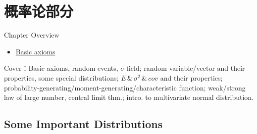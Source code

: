 \section{概率论部分}\label{Section1Probability}
    Chapter Overview
\begin{itemize}[topsep=2pt,itemsep=2pt]
    \item \hyperlink{Basic axioms}{Basic axioms}
\end{itemize}

    









    Cover：Basic axioms, random events, $\sigma$-field; random variable/vector and their properties, some special distributions; $E$\,\&\,$\sigma^2$\,\&\,$cov$ and their properties; probability-generating/moment-generating/characteristic function; weak/strong law of large number, central limit thm.; intro. to multivariate normal distribution.



\subsection{Some Important Distributions}\label{SectionImportantDistributions}


